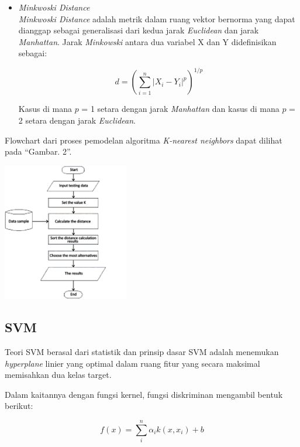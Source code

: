 \documentclass[conference]{IEEEtran}
\begin{document}
\begin{itemize}
\item \emph{Minkwoski Distance}\\
\emph{Minkwoski Distance} adalah metrik dalam ruang vektor bernorma yang dapat dianggap sebagai generalisasi dari kedua jarak \emph{Euclidean} dan jarak \emph{Manhattan}. Jarak \emph{Minkowski} antara dua variabel X dan Y didefinisikan sebagai:

\begin{equation*}
d = (\sum^{n}_{i=1} | X_i-Y_i |^p)^{1/p}
\label{eq3}
\end{equation*}

Kasus di mana $p$ = 1 setara dengan jarak \emph{Manhattan} dan kasus di mana $p$ = 2 setara dengan jarak \emph{Euclidean}.

\end{itemize}

Flowchart dari proses pemodelan algoritma \emph{K-nearest neighbors} dapat dilihat pada ``Gambar. 2''\cite{lubis2020optimization}.\vspace{6pt}

\begin{minipage}{\linewidth}
\centerline{\includegraphics[width=55mm]{Gambar/Gbr002.jpg}}
\label{fig2}
\end{minipage}

\subsection{SVM}

Teori SVM berasal dari statistik dan prinsip dasar SVM adalah menemukan \emph{hyperplane} linier yang optimal dalam ruang fitur yang secara maksimal memisahkan dua kelas target\cite{hasan}.

Dalam kaitannya dengan fungsi kernel, fungsi diskriminan mengambil bentuk berikut:

\begin{equation*}
f(x) = \sum^{n}_i \alpha_ik(x,x_i)+b
\label{eq4}
\end{equation*}
\end{document}
